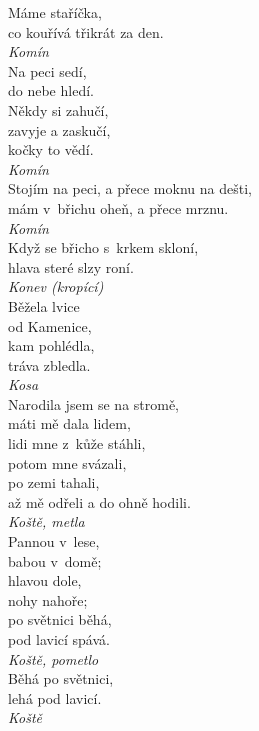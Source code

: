 \begin{multicols}{\value{columnsthindata}}
\noindent
Máme staříčka,\\
co kouřívá třikrát za den.\\[1 mm]
{\sl Komín}\\

\noindent
Na peci sedí,\\
do nebe hledí.\\
Někdy si zahučí,\\
zavyje a zaskučí,\\
kočky to vědí.\\[1 mm]
{\sl Komín}\\

\noindent
Stojím na peci, a přece moknu na dešti,\\
mám v~břichu oheň, a přece mrznu.\\[1 mm]
{\sl Komín}\\

\noindent
Když se břicho s~krkem skloní,\\
hlava steré slzy roní.\\[1 mm]
{\sl Konev (kropící)}\\

\noindent
Běžela lvice\\
od Kamenice,\\
kam pohlédla,\\
tráva zbledla.\\[1 mm]
{\sl Kosa}\\

\noindent
Narodila jsem se na stromě,\\
máti mě dala lidem,\\
lidi mne z~kůže stáhli,\\
potom mne svázali,\\
po zemi tahali,\\
až mě odřeli a do ohně hodili.\\[1 mm]
{\sl Koště, metla}\\

\noindent
Pannou v~lese,\\
babou v~domě;\\
hlavou dole,\\
nohy nahoře;\\
po světnici běhá,\\
pod lavicí spává.\\[1 mm]
{\sl Koště, pometlo}\\

\noindent
Běhá po světnici,\\
lehá pod lavicí.\\[1 mm]
{\sl Koště}\\


\end{multicols}
